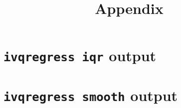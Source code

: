 \documentclass[12pt]{article}
\title{Appendix}
\date{}
\begin{document}
\maketitle
\tableofcontents
\clearpage

\section{{\tt ivqregress iqr} output}
\begin{stlog}

\end{stlog}

\section{{\tt ivqregress smooth} output}
\begin{stlog}

\end{stlog}
\end{document}
